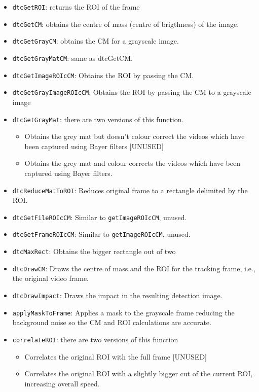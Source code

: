 \documentclass[a4paper,11pt]{memoir}
\begin{document}
\begin{itemize}
\item \texttt{dtcGetROI}: returns the ROI of the frame
\item \texttt{dtcGetCM}: obtains the centre of mass (centre of brigthness) of the image.
\item \texttt{dtcGetGrayCM}: obtains the CM for a grayscale image.
\item \texttt{dtcGetGrayMatCM}: same as dtcGetCM.
\item \texttt{dtcGetImageROIcCM}: Obtains the ROI by passing the CM.
\item \texttt{dtcGetGrayImageROIcCM}: Obtains the ROI by passing the CM to a grayscale image
\item \texttt{dtcGetGrayMat}: there are two versions of this function.
\begin{itemize}
\item Obtains the grey mat but doesn’t colour correct the videos which have been captured using Bayer filters [UNUSED]
\item Obtains the grey mat and colour corrects the videos which have been captured using Bayer filters.
\end{itemize}
\item \texttt{dtcReduceMatToROI}: Reduces original frame to a rectangle delimited by the ROI.
\item \texttt{dtcGetFileROIcCM}: Similar to \texttt{getImageROIcCM}, unused.
\item \texttt{dtcGetFrameROIcCM}: Similar to \texttt{getImageROIcCM}, unused.
\item \texttt{dtcMaxRect}: Obtains the bigger rectangle out of two
\item \texttt{dtcDrawCM}: Draws the centre of mass and the ROI for the tracking frame, i.e., the
original video frame.
\item \texttt{dtcDrawImpact}: Draws the impact in the resulting detection image.
\item \texttt{applyMaskToFrame}: Applies a mask to the grayscale frame reducing the background noise so the CM and ROI calculations are accurate.
\item \texttt{correlateROI}: there are two versions of this function
\begin{itemize}
\item Correlates the original ROI with the full frame [UNUSED]
\item Correlates the original ROI with a slightly bigger cut of the current ROI, increasing overall speed.

\end{itemize}
\end{itemize}
\end{document}
